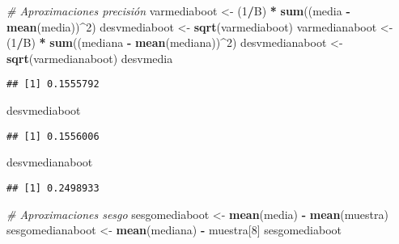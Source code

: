 \documentclass[
]{book}
\newenvironment{Shaded}{\begin{snugshade}}{\end{snugshade}}
\newcommand{\CommentTok}[1]{\textcolor[rgb]{0.56,0.35,0.01}{\textit{#1}}}
\newcommand{\DecValTok}[1]{\textcolor[rgb]{0.00,0.00,0.81}{#1}}
\newcommand{\KeywordTok}[1]{\textcolor[rgb]{0.13,0.29,0.53}{\textbf{#1}}}
\newcommand{\NormalTok}[1]{#1}
\newcommand{\OperatorTok}[1]{\textcolor[rgb]{0.81,0.36,0.00}{\textbf{#1}}}
\newcommand{\StringTok}[1]{\textcolor[rgb]{0.31,0.60,0.02}{#1}}
\theoremstyle{definition}
\theoremstyle{definition}
\theoremstyle{definition}
\theoremstyle{remark}
\begin{document}
\begin{Shaded}
\begin{Highlighting}[]
\CommentTok{# Aproximaciones precisión}
\NormalTok{varmediaboot <-}\StringTok{ }\NormalTok{(}\DecValTok{1}\OperatorTok{/}\NormalTok{B) }\OperatorTok{*}\StringTok{ }\KeywordTok{sum}\NormalTok{((media }\OperatorTok{-}\StringTok{ }\KeywordTok{mean}\NormalTok{(media))}\OperatorTok{^}\DecValTok{2}\NormalTok{)}
\NormalTok{desvmediaboot <-}\StringTok{ }\KeywordTok{sqrt}\NormalTok{(varmediaboot)}
\NormalTok{varmedianaboot <-}\StringTok{ }\NormalTok{(}\DecValTok{1}\OperatorTok{/}\NormalTok{B) }\OperatorTok{*}\StringTok{ }\KeywordTok{sum}\NormalTok{((mediana }\OperatorTok{-}\StringTok{ }\KeywordTok{mean}\NormalTok{(mediana))}\OperatorTok{^}\DecValTok{2}\NormalTok{)}
\NormalTok{desvmedianaboot <-}\StringTok{ }\KeywordTok{sqrt}\NormalTok{(varmedianaboot)}
\NormalTok{desvmedia}
\end{Highlighting}
\end{Shaded}

\begin{verbatim}
## [1] 0.1555792
\end{verbatim}

\begin{Shaded}
\begin{Highlighting}[]
\NormalTok{desvmediaboot}
\end{Highlighting}
\end{Shaded}

\begin{verbatim}
## [1] 0.1556006
\end{verbatim}

\begin{Shaded}
\begin{Highlighting}[]
\NormalTok{desvmedianaboot}
\end{Highlighting}
\end{Shaded}

\begin{verbatim}
## [1] 0.2498933
\end{verbatim}

\begin{Shaded}
\begin{Highlighting}[]
\CommentTok{# Aproximaciones sesgo}
\NormalTok{sesgomediaboot <-}\StringTok{ }\KeywordTok{mean}\NormalTok{(media) }\OperatorTok{-}\StringTok{ }\KeywordTok{mean}\NormalTok{(muestra)}
\NormalTok{sesgomedianaboot <-}\StringTok{ }\KeywordTok{mean}\NormalTok{(mediana) }\OperatorTok{-}\StringTok{ }\NormalTok{muestra[}\DecValTok{8}\NormalTok{]}
\NormalTok{sesgomediaboot}
\end{Highlighting}
\end{Shaded}
\end{document}
